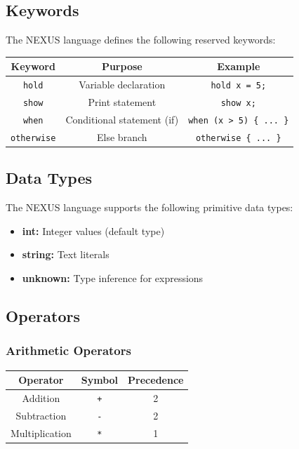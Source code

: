 \documentclass[12pt,a4paper]{report}
\begin{document}
\subsection{Keywords}
The NEXUS language defines the following reserved keywords:

\begin{center}
\begin{tabular}{|c|c|c|}
\hline
\textbf{Keyword} & \textbf{Purpose} & \textbf{Example} \\
\hline
\texttt{hold} & Variable declaration & \texttt{hold x = 5;} \\
\hline
\texttt{show} & Print statement & \texttt{show x;} \\
\hline
\texttt{when} & Conditional statement (if) & \texttt{when (x > 5) \{ ... \}} \\
\hline
\texttt{otherwise} & Else branch & \texttt{otherwise \{ ... \}} \\
\hline
\end{tabular}
\end{center}

\subsection{Data Types}
The NEXUS language supports the following primitive data types:

\begin{itemize}
    \item \textbf{int:} Integer values (default type)
    \item \textbf{string:} Text literals
    \item \textbf{unknown:} Type inference for expressions
\end{itemize}

\subsection{Operators}

\subsubsection{Arithmetic Operators}
\begin{center}
\begin{tabular}{|c|c|c|}
\hline
\textbf{Operator} & \textbf{Symbol} & \textbf{Precedence} \\
\hline
Addition & \texttt{+} & 2 \\
\hline
Subtraction & \texttt{-} & 2 \\
\hline
Multiplication & \texttt{*} & 1 \\
\hline
\end{tabular}
\end{center}
\end{document}
